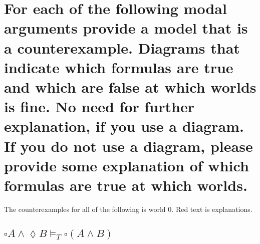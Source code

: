 \documentclass[10pt, letterpaper, titlepage]{article}
\begin{document}
    \newpage
    \section{For each of the following modal arguments provide a model that is a counterexample.
        Diagrams that indicate which formulas are true and which are false at which worlds
        is fine. No need for further explanation, if you use a diagram. If you do not use a
        diagram, please provide some explanation of which formulas are true at which worlds.
    }
        The counterexamples for all of the following is world 0. 
        {\color{red} Red} text is explanations. 
        \subsection{$\square A \land \lozenge B \vDash_T \square(A \land B)$}
            \begin{center}
            \end{center}
\end{document}
